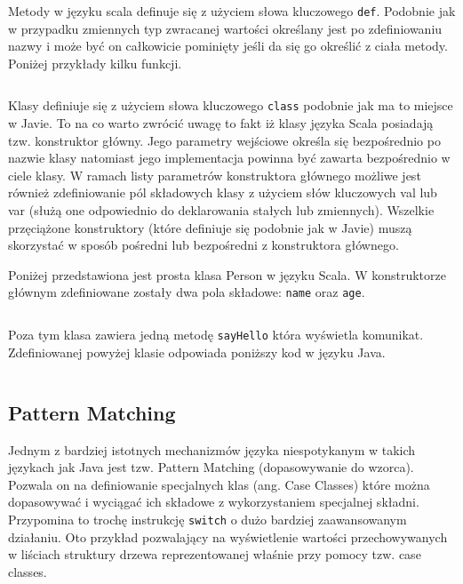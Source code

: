 \documentclass[brudnopis]{xmgr}
\begin{document}
\inputminted{scala}{listings/scala/val-var-declarations.scala}
\inputminted{scala}{listings/scala/val-var-declarations.scala}

Metody w języku scala definuje się z użyciem słowa kluczowego \texttt{def}. Podobnie jak w przypadku zmiennych typ zwracanej wartości określany jest po zdefiniowaniu nazwy i może być on całkowicie pominięty jeśli da się go określić z ciała metody. Poniżej przykłady kilku funkcji.

\inputminted{scala}{listings/scala/functions-example.scala}

Klasy definiuje się z użyciem słowa kluczowego \texttt{class} podobnie jak ma to miejsce w Javie. To na co warto zwrócić uwagę to fakt iż klasy języka Scala posiadają tzw. konstruktor główny. Jego parametry wejściowe określa się bezpośrednio po nazwie klasy natomiast jego implementacja powinna być zawarta bezpośrednio w ciele klasy. W ramach listy parametrów konstruktora głównego możliwe jest również zdefiniowanie pól składowych klasy z użyciem słów kluczowych val lub var (służą one odpowiednio do deklarowania stałych lub zmiennych). Wszelkie przęciążone konstruktory (które definiuje się podobnie jak w Javie) muszą skorzystać w sposób pośredni lub bezpośredni z konstruktora głównego.

Poniżej przedstawiona jest prosta klasa Person w języku Scala. W konstruktorze głównym zdefiniowane zostały dwa pola składowe: \texttt{name} oraz \texttt{age}.

\inputminted{scala}{listings/scala/simple-class-person.scala}

Poza tym klasa zawiera jedną metodę \texttt{sayHello} która wyświetla komunikat.
Zdefiniowanej powyżej klasie odpowiada poniższy kod w języku Java.

\inputminted{scala}{listings/java/simple-class-person.java}

\subsection{Pattern Matching}

Jednym z bardziej istotnych mechanizmów języka niespotykanym w takich językach jak Java jest tzw. Pattern Matching (dopasowywanie do wzorca). Pozwala on na definiowanie specjalnych klas (ang. Case Classes) które można dopasowywać i wyciągać ich składowe z wykorzystaniem specjalnej składni. Przypomina to trochę instrukcję \texttt{switch} o dużo bardziej zaawansowanym działaniu. Oto przykład pozwalający na wyświetlenie wartości przechowywanych w liściach struktury drzewa reprezentowanej właśnie przy pomocy tzw. case classes.
\end{document}
